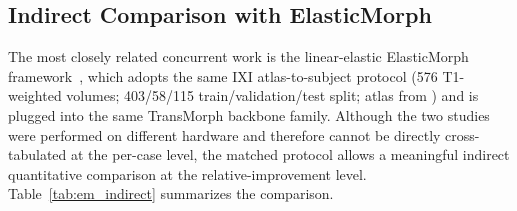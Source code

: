 \documentclass[jimaging,article,submit,pdftex,moreauthors]{Definitions/mdpi}
\begin{document}
\subsection{Indirect Comparison with ElasticMorph}\label{sec:elasticmorph_indirect}
The most closely related concurrent work is the linear-elastic ElasticMorph framework~\cite{elasticmorph2025}, which adopts the same IXI atlas-to-subject protocol (576 T1-weighted volumes; 403/58/115 train/validation/test split; atlas from \citet{kim2021cyclemorph}) and is plugged into the same TransMorph backbone family. Although the two studies were performed on different hardware and therefore cannot be directly cross-tabulated at the per-case level, the matched protocol allows a meaningful indirect quantitative comparison at the relative-improvement level. Table~\ref{tab:em_indirect} summarizes the comparison.
\end{document}
